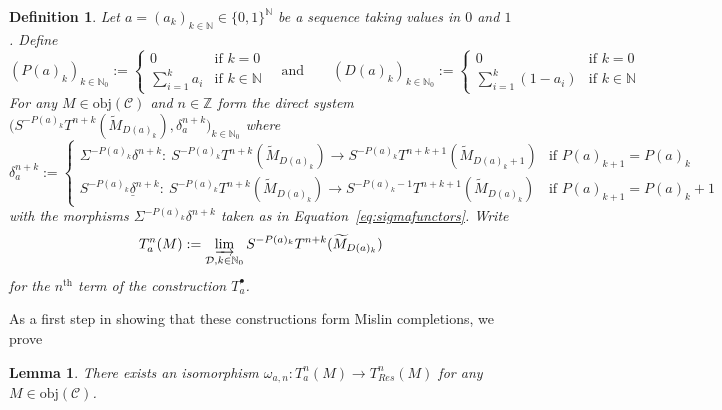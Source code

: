 \documentclass[12pt,a4paper]{article}
\numberwithin{equation}{section}
\newtheorem{lem}[thm]{Lemma}
\newtheorem{defn}[thm]{Definition}
\theoremstyle{nonumberplain}
\begin{document}
\begin{defn}
Let $a = (a_k)_{k \in \mathbb{N}} \in \lbrace 0, 1 \rbrace^{\mathbb{N}}$ be a sequence taking values in $0$ and $1$. Define
\[ (P(a)_k)_{k \in \mathbb{N}_0} := \begin{cases} 0 &\text{if } k = 0 \\ \sum_{i = 1}^k a_i &\text{if } k \in \mathbb{N} \end{cases} \quad \text{and} \qquad (D(a)_k)_{k \in \mathbb{N}_0} := \begin{cases} 0 &\text{if } k = 0 \\ \sum_{i = 1}^k (1-a_i) &\text{if } k \in \mathbb{N} \end{cases} \]
For any $M \in \mathrm{obj}(\mathcal{C})$ and $n \in \mathbb{Z}$ form the direct system $\big(S^{-P(a)_k}T^{n+k}(\widetilde{M}_{D(a)_k}), \delta_a^{n+k} \big)_{k \in \mathbb{N}_0}$ where
\[ \delta_a^{n+k} := \begin{cases} {\scriptstyle \Sigma^{-P(a)_k}\delta^{n+k}: \: S^{-P(a)_k}T^{n+k}(\widetilde{M}_{D(a)_k}) \rightarrow S^{-P(a)_k}T^{n+k+1}(\widetilde{M}_{D(a)_k+1})} &{\scriptstyle \text{if } P(a)_{k+1} = P(a)_k} \\ {\scriptstyle S^{-P(a)_k}\underline{\delta}^{n+k}: \: S^{-P(a)_k}T^{n+k}(\widetilde{M}_{D(a)_k}) \rightarrow S^{-P(a)_k-1}T^{n+k+1}(\widetilde{M}_{D(a)_k})} &{\scriptstyle \text{if } P(a)_{k+1} = P(a)_k+1} \end{cases} \]
with the morphisms $\Sigma^{-P(a)_k}\delta^{n+k}$ taken as in Equation~\ref{eq:sigmafunctors}. Write
\[ T_a^n(M) := \varinjlim_{\mathcal{D}, k \in \mathbb{N}_0} S^{-P(a)_k}T^{n+k}(\widetilde{M}_{D(a)_k}) \]
for the $n^{\text{th}}$ term of the construction $T_a^{\bullet}$.
\end{defn}

As a first step in showing that these constructions form Mislin completions, we prove

\begin{lem}\label{lem:oneconstrofcompletion}
There exists an isomorphism $\omega_{a, n}: T_a^n(M) \rightarrow T_{Res}^n(M)$ for any $M \in \mathrm{obj}(\mathcal{C})$.
\end{lem}
\end{document}
